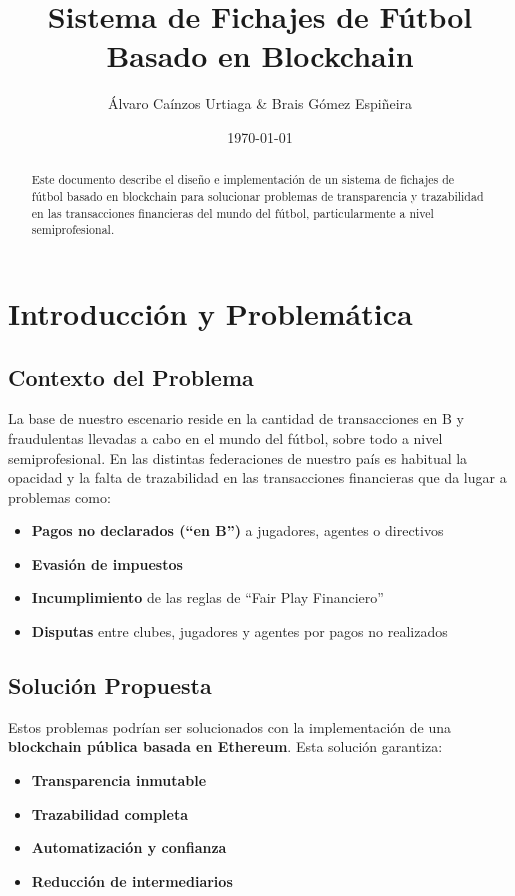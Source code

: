 \documentclass[12pt,a4paper]{article}
\title{Sistema de Fichajes de Fútbol Basado en Blockchain}
\author{Álvaro Caínzos Urtiaga & Brais Gómez Espiñeira}
\date{\today}
\begin{document}
	
	\maketitle
	
	\begin{abstract}
		Este documento describe el diseño e implementación de un sistema de fichajes de fútbol basado en blockchain para solucionar problemas de transparencia y trazabilidad en las transacciones financieras del mundo del fútbol, particularmente a nivel semiprofesional.
	\end{abstract}
	
	\section{Introducción y Problemática}
	
	\subsection{Contexto del Problema}
	La base de nuestro escenario reside en la cantidad de transacciones en B y fraudulentas llevadas a cabo en el mundo del fútbol, sobre todo a nivel semiprofesional. En las distintas federaciones de nuestro país es habitual la opacidad y la falta de trazabilidad en las transacciones financieras que da lugar a problemas como:
	
	\begin{itemize}
		\item \textbf{Pagos no declarados (``en B'')} a jugadores, agentes o directivos
		\item \textbf{Evasión de impuestos}
		\item \textbf{Incumplimiento} de las reglas de ``Fair Play Financiero''
		\item \textbf{Disputas} entre clubes, jugadores y agentes por pagos no realizados
	\end{itemize}
	
	\subsection{Solución Propuesta}
	Estos problemas podrían ser solucionados con la implementación de una \textbf{blockchain pública basada en Ethereum}. Esta solución garantiza:
	
	\begin{itemize}
		\item \textbf{Transparencia inmutable}
		\item \textbf{Trazabilidad completa}
		\item \textbf{Automatización y confianza}
		\item \textbf{Reducción de intermediarios}
	\end{itemize}
	
\end{document}
